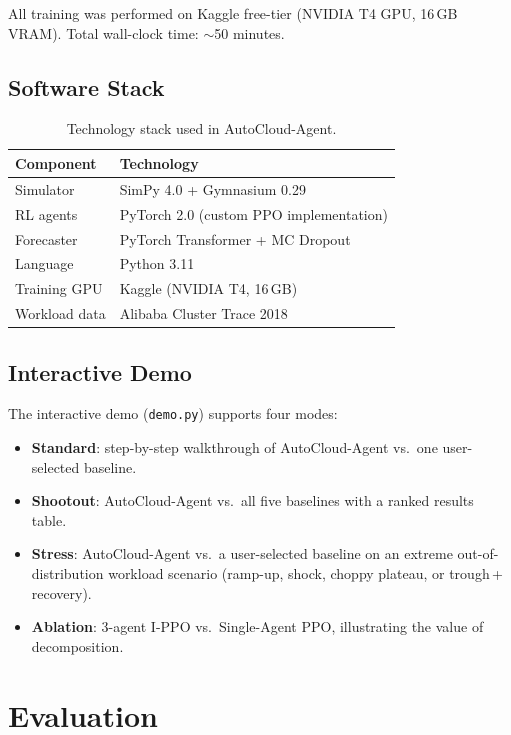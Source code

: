 \documentclass[conference]{IEEEtran}
\begin{document}
All training was performed on Kaggle free-tier (NVIDIA T4 GPU, 16\,GB VRAM).
Total wall-clock time: ${\sim}$50 minutes.

\subsection{Software Stack}

\begin{table}[h]
\centering
\caption{Technology stack used in AutoCloud-Agent.}
\begin{tabular}{ll}
\toprule
\textbf{Component} & \textbf{Technology} \\
\midrule
Simulator    & SimPy 4.0 + Gymnasium 0.29 \\
RL agents    & PyTorch 2.0 (custom PPO implementation) \\
Forecaster   & PyTorch Transformer + MC Dropout \\
Language     & Python 3.11 \\
Training GPU & Kaggle (NVIDIA T4, 16\,GB) \\
Workload data& Alibaba Cluster Trace 2018~\cite{alibaba2018} \\
\bottomrule
\end{tabular}
\end{table}

\subsection{Interactive Demo}

The interactive demo (\texttt{demo.py}) supports four modes:
\begin{itemize}[leftmargin=*]
  \item \textbf{Standard}: step-by-step walkthrough of AutoCloud-Agent
        vs.\ one user-selected baseline.
  \item \textbf{Shootout}: AutoCloud-Agent vs.\ all five baselines with a
        ranked results table.
  \item \textbf{Stress}: AutoCloud-Agent vs.\ a user-selected baseline on an
        extreme out-of-distribution workload scenario (ramp-up, shock, choppy
        plateau, or trough\,+\,recovery).
  \item \textbf{Ablation}: 3-agent I-PPO vs.\ Single-Agent PPO,
        illustrating the value of decomposition.
\end{itemize}

\section{Evaluation}
\end{document}
